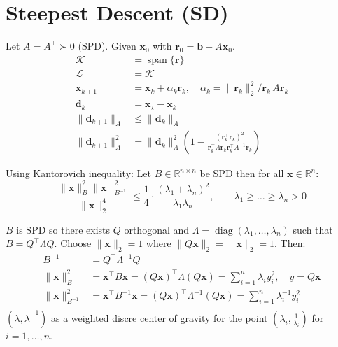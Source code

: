 \section{Steepest Descent (SD)}

Let $A = A^{\top} \succ 0$ (SPD). Given $\mathbf{x}_0$ with $\mathbf{r}_0 = \mathbf{b} - A\mathbf{x}_0$.
\begin{align*}
    \mathcal{K}              & = \operatorname{span}\{\mathbf{r}\}                                                                                                                            \\
    \mathcal{L}              & = \mathcal{K}                                                                                                                                                  \\
    \mathbf{x}_{k+1}         & = \mathbf{x}_k + \alpha_k \mathbf{r}_k, \quad \alpha_k = \|\mathbf{r}_k\|_2^2 / \mathbf{r}_k^{\top} A \mathbf{r}_k                                             \\
    \mathbf{d}_k             & = \mathbf{x}_{\star} - \mathbf{x}_k                                                                                                                            \\
    \|\mathbf{d}_{k+1}\|_A   & \leq \|\mathbf{d}_k\|_A                                                                                                                                        \\
    \|\mathbf{d}_{k+1}\|_A^2 & = \|\mathbf{d}_k\|_A^2\left(1 - \frac{(\mathbf{r}_k^{\top} \mathbf{r}_k)^2}{\mathbf{r}_k^{\top} A \mathbf{r}_k \mathbf{r}_k^{\top} A^{-1} \mathbf{r}_k}\right)
\end{align*}

Using Kantorovich inequality: Let $B \in \mathbb{R}^{n \times n}$ be SPD then for all $\mathbf{x} \in \mathbb{R}^n$:
\[
    \frac{\|\mathbf{x}\|_B^2 \|\mathbf{x}\|_{B^{-1}}^2}{\|\mathbf{x}\|_2^4} \leq \frac{1}{4}\cdot\frac{(\lambda_1 + \lambda_n)^2}{\lambda_1 \lambda_n}, \qquad \lambda_1 \geq \ldots \geq \lambda_n > 0
\]

$B$ is SPD so there exists $Q$ orthogonal and $\Lambda = \operatorname{diag}(\lambda_1, \ldots, \lambda_n)$ such that $B = Q^{\top}\Lambda Q$. Choose $\|\mathbf{x}\|_2 = 1$ where $\|Q \mathbf{x}\|_2 = \|\mathbf{x}\|_2 = 1$. Then:
\begin{align*}
    B^{-1}                    & = Q^{\top} \Lambda^{-1} Q                                                                                                           \\
    \|\mathbf{x}\|_B^2        & = \mathbf{x}^{\top} B \mathbf{x} = (Q\mathbf{x})^{\top} \Lambda (Q\mathbf{x}) = \sum_{i=1}^n \lambda_i y_i^2, \quad y = Q\mathbf{x} \\
    \|\mathbf{x}\|_{B^{-1}}^2 & = \mathbf{x}^{\top} B^{-1} \mathbf{x} = (Q\mathbf{x})^{\top} \Lambda^{-1} (Q\mathbf{x}) = \sum_{i=1}^n \lambda_i^{-1} y_i^2         \\
\end{align*}
$(\overline{\lambda}, \overline{\lambda}^{-1})$ as a weighted discre center of gravity for the point $(\lambda_i, \frac{1}{\lambda_i})$ for $i = 1, \ldots, n$.


